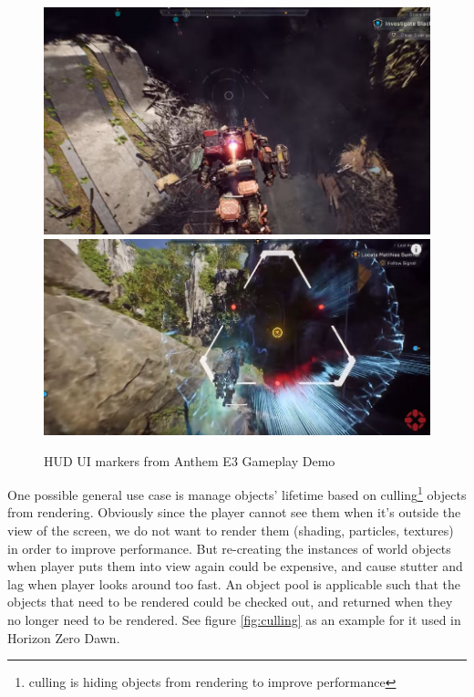 \begin{multicols}{2}
\begin{figure}[H]
	\centering
	\includegraphics[width=\fullwidth]{assets/anthem-markers}
	\includegraphics[width=\fullwidth]{assets/anthem-markers2}
	\caption{HUD UI markers from Anthem E3 Gameplay Demo\cite{anthem-e3}}
	\label{fig:anthem-hud-markers}
\end{figure}

One possible general use case is manage objects' lifetime based on culling\footnote{culling is hiding objects from rendering to improve performance} objects from rendering. Obviously since the player cannot see them when it's outside the view of the screen, we do not want to render them (shading, particles, textures) in order to improve performance. But re-creating the instances of world objects when player puts them into view again could be expensive, and cause stutter and lag when player looks around too fast. An object pool is applicable such that the objects that need to be rendered could be checked out, and returned when they no longer need to be rendered. See figure \ref{fig:culling} as an example for it used in Horizon Zero Dawn\cite{hzd}.\bs
\\

\iftwocolumns
\end{multicols}
